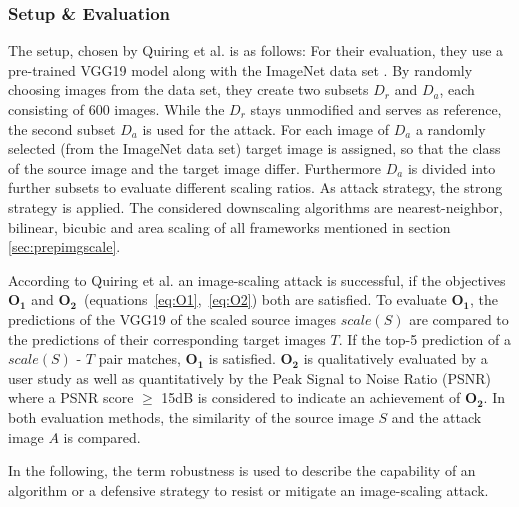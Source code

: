 \documentclass[sigconf]{acmart}
\begin{document}
\subsubsection{Setup \& Evaluation}
The setup, chosen by Quiring et al.\cite{imgscale} is as follows:
For their evaluation, they use a pre-trained VGG19 model \cite{DBLP:journals/corr/SimonyanZ14a} along with the ImageNet data set \cite{ILSVRC15}.
By randomly choosing images from the data set, they create two subsets $D_r$ and $D_a$, each consisting of 600 images.
While the $D_r$ stays unmodified and serves as reference, the second subset $D_a$ is used for the attack.
For each image of $D_a$ a randomly selected (from the ImageNet data set) target image is assigned, so that the class of the source image and the target image differ.
Furthermore $D_a$ is divided into further subsets to evaluate different scaling ratios.
As attack strategy, the strong strategy is applied.
The considered downscaling algorithms are nearest-neighbor, bilinear, bicubic and area scaling of all frameworks mentioned in section \ref{sec:prepimgscale}.

According to Quiring et al. an image-scaling attack is successful, if the objectives $\boldsymbol{O_1}$ and $\boldsymbol{O_2}$~(equations~\ref{eq:O1},~\ref{eq:O2}) both are satisfied.
To evaluate $\boldsymbol{O_1}$, the predictions of the VGG19 of the scaled source images $scale(S)$ are compared to the predictions of their corresponding target images $T$.
If the top-5 prediction of a $scale(S)$ - $T$ pair matches, $\boldsymbol{O_1}$ is satisfied.
$\boldsymbol{O_2}$ is qualitatively evaluated by a user study as well as quantitatively by the Peak Signal to Noise Ratio (PSNR) where a PSNR score $\geq$ 15dB is considered to indicate an achievement of $\boldsymbol{O_2}$.
In both evaluation methods, the similarity of the source image $S$ and the attack image $A$ is compared.

In the following, the term robustness is used to describe the capability of an algorithm or a defensive strategy to resist or mitigate an image-scaling attack.
\end{document}
